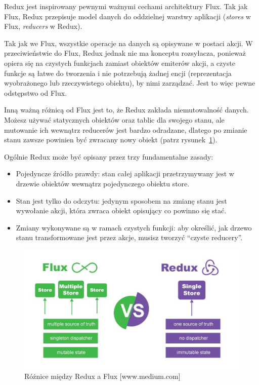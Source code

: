 Redux jest inspirowany pewnymi ważnymi cechami architektury Flux.
Tak jak Flux, Redux przepisuje model danych do oddzielnej warstwy aplikacji
(\textit{stores} w Flux, \textit{reducers} w Redux).

Tak jak we Flux, wszystkie operacje na danych są opisywane w postaci akcji.
W przeciwieństwie do Flux, Redux jednak nie ma konceptu rozsyłacza,
ponieważ opiera się na czystych funkcjach zamiast obiektów emiterów akcji,
a czyste funkcje są łatwe do tworzenia i nie potrzebują żadnej encji
(reprezentacja wyobrażonego lub rzeczywistego obiektu), by nimi zarządzać.
Jest to więc pewne odstępstwo od Flux.
~\cite{www_nafrontendzie}

Inną ważną różnicą od Flux jest to, że Redux zakłada niemutowalność danych.
Możesz używać statycznych obiektów oraz tablic dla swojego stanu,
ale mutowanie ich wewnątrz reducerów jest bardzo odradzane,
dlatego po zmianie stanu zawsze powinien być zwracany nowy obiekt (patrz rysunek~\ref{rys:reduxFlux}).

Ogólnie Redux może być opisany przez trzy fundamentalne zasady:
\begin{itemize}
	\item Pojedyncze źródło prawdy: stan całej aplikacji przetrzymywany jest
	w drzewie obiektów wewnątrz pojedynczego obiektu store.
	\item Stan jest tylko do odczytu: jedynym sposobem na zmianę stanu jest wywołanie akcji,
	która zwraca obiekt opisujący co powinno się stać.
	\item Zmiany wykonywane są w ramach czystych funkcji: aby określić, jak drzewo stanu
	transformowane jest przez akcje, musisz tworzyć ``czyste reducery''.
\end{itemize}

\begin{figure}
	\centering\includegraphics[width=\textwidth]{img/reduxFlux.jpeg}
	\caption{Różnice między Redux a Flux [www.medium.com]}\label{rys:reduxFlux}%
\end{figure}

